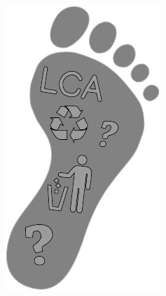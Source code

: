 \documentclass[a0paper,fleqn]{betterposter}
\begin{document}
{{\begin{minipage}{0.60\textwidth}
\begin{center}
\end{center}
\end{minipage}
\begin{minipage}{0.4\textwidth}
\begin{flushleft}
\vspace{pt}
\includegraphics[width=\textwidth]{img/foot.pdf}
\end{flushleft}
\end{minipage}
\vspace{50pt}

}}
\end{document}
